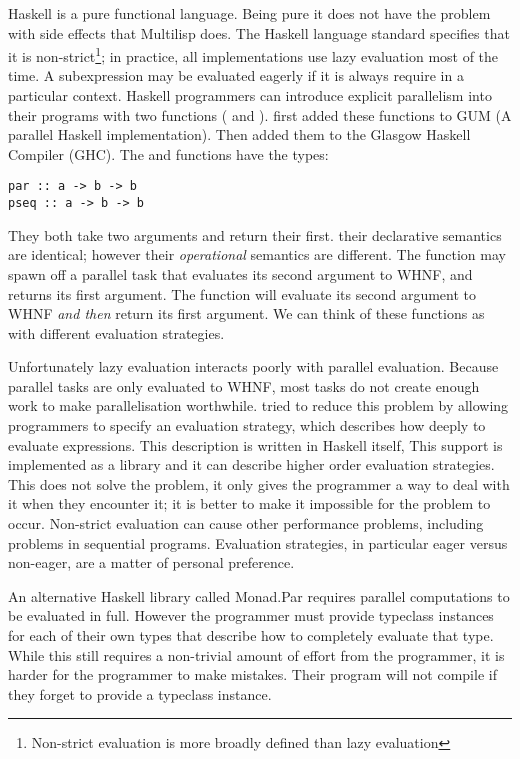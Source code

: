 Haskell is a pure functional language.
Being pure it does not have the problem with side effects that Multilisp
does.
The Haskell language standard specifies that it is non-strict\footnote{
    Non-strict evaluation is more broadly defined than lazy evaluation};
in practice, all implementations use lazy evaluation most of the time.
A subexpression may be evaluated eagerly if it is always require in a
particular context.
Haskell programmers can introduce explicit parallelism into their programs
with two functions ( and ).
\citet*{gph:gum}
first added these functions to GUM (A parallel Haskell implementation).
Then \citet*{harris:2005:haskell-smp} added them to the
Glasgow Haskell Compiler (GHC).
The  and  functions have the types:

\begin{verbatim}
par :: a -> b -> b
pseq :: a -> b -> b
\end{verbatim}
They both take two arguments and return their first.
their declarative semantics are identical;
however their \emph{operational} semantics are different.
The  function may spawn off a parallel task that evaluates its
second argument to WHNF,
and returns its first argument.
The  function will evaluate its second argument to WHNF
\emph{and then} return its first argument.
We can think of these functions as  with different evaluation
strategies.

Unfortunately lazy evaluation interacts poorly with
parallel evaluation.
Because parallel tasks are only evaluated to WHNF,
most tasks do not create enough work to make parallelisation worthwhile.
\citet*{trinder:98:strategies}
tried to reduce this problem by allowing programmers to
specify an evaluation strategy,
which describes how deeply to evaluate expressions.
This description is written in Haskell itself,
This support is implemented as a library and it can describe higher order
evaluation strategies.
This does not solve the problem,
it only gives the programmer a way to deal with it when they encounter it;
it is better to make it impossible for the problem to occur.
Non-strict evaluation can cause other performance problems,
including problems in sequential programs.
Evaluation strategies, in particular eager versus non-eager,
are a matter of personal preference.

An alternative Haskell library called Monad.Par \citep{marlow:monadpar}
requires parallel computations to be evaluated in full.
However the programmer must provide typeclass instances for each of their
own types that describe how to completely evaluate that type.
While this still requires a non-trivial amount of effort from the
programmer,
it is harder for the programmer to make mistakes.
Their program will not compile if they forget to provide a typeclass
instance.

